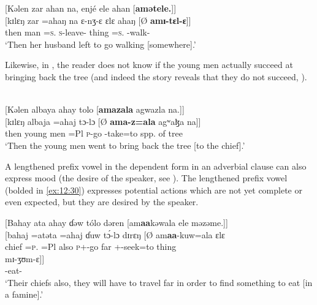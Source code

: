 \ea \label{ex:12:28}
{}[Kəlen  zar  ahan  na,  enjé  ele  ahan  [\textbf{amətele.}]]\\
\gll  {}[kɪlɛŋ  zar  =ahaŋ    na  ɛ{}-nʒ-ɛ    ɛlɛ  ahaŋ      [Ø \textbf{amɪ-tɛl-ɛ}]]\\
      then    man  =\textsc{s}.{\POSS}  {\PSP}  \textsc{s}-leave-{\CL}  thing  =\textsc{s}.{\POSS} {} {\DEP}-walk-{\CL}\\
\glt  ‘Then her husband left to go walking [somewhere].’ 
\z 

Likewise, in , the reader does not know if the young men actually succeed at bringing back the tree (and indeed the story reveals that they do not succeed, ).

\ea \label{ex:12:29}
\\
{}[Kəlen  albaya  ahay  tolo  [\textbf{amazala}  agwazla  na.]]\\
\gll  {}[kɪlɛŋ  albaja    =ahaj  tɔ-lɔ  [Ø \textbf{ama-z=ala}  agʷaɮa    na]]\\
      then    {young men}  =Pl  \textsc{p}-go   {}  {\DEP}-take=to  {spp. of tree}  {\PSP}\\
\glt  ‘Then the young men went to bring back the tree [to the chief].’
\z 

A lengthened prefix vowel in the dependent form in an adverbial clause can also express mood (the desire of the speaker, see ). The lengthened prefix vowel (bolded in \ref{ex:12:30}) expresses potential actions which are not yet complete or even expected, but they are desired by the speaker.

\clearpage
\ea \label{ex:12:30}
{}[Bahay  ata  ahay  ɗəw  tólo  dəren  [am\textbf{aa}kəwala  ele  məzəme.]]\\
\gll  {}[bahaj  =atəta     =ahaj  ɗuw  t\'{ɔ}-lɔ    dɪrɛŋ      {}[Ø  am\textbf{aa}-kuw=ala ɛlɛ\\  
      chief    =\textsc{p}.{\POSS}     =Pl  also  \textsc{p}+{\IFV}-go  far    { }  {\DEP}+{\POT}{}-seek=to  thing\\ 
      
      \medskip
\gll mɪ-ʒʊm-ɛ]]\\
     {\NOM}{}-eat-{\CL}\\ 
\glt  ‘Their chiefs also, they will have to travel far in order to find something to eat [in a famine].’ 
\z 

